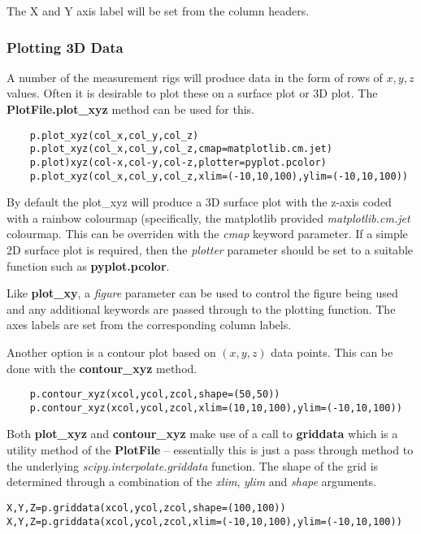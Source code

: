 \documentclass[a4paper,11pt]{scrartcl}
\begin{document}
The X and Y axis label will be set from the column headers.

\subsubsection{Plotting 3D Data}

 A number of the measurement rigs will produce data in the form of rows of $x,y,z$ values. Often it is desirable to plot these on a surface plot or 3D plot. The \textbf{PlotFile.plot\_xyz} method can be used for this.

 \begin{lstlisting}
    p.plot_xyz(col_x,col_y,col_z)
    p.plot_xyz(col_x,col_y,col_z,cmap=matplotlib.cm.jet)
    p.plot)xyz(col-x,col-y,col-z,plotter=pyplot.pcolor)
    p.plot_xyz(col_x,col_y,col_z,xlim=(-10,10,100),ylim=(-10,10,100))
 \end{lstlisting}

 By default the plot\_xyz will produce a 3D surface plot with the z-axis coded with a rainbow colourmap (specifically, the matplotlib provided \textit{matplotlib.cm.jet} colourmap. This can be overriden with the \textit{cmap} keyword parameter. If a simple 2D surface plot is required, then the \textit{plotter} parameter should be set to a suitable function such as \textbf{pyplot.pcolor}.

 Like \textbf{plot\_xy}, a \textit{figure} parameter can be used to control the figure being used and any additional keywords are passed through to the plotting function. The axes labels are set from the corresponding column labels.
 
 Another option is a contour plot based on $(x,y,z)$ data points. This can be done with the \textbf{contour\_xyz} method.
 
 \begin{lstlisting}
 	p.contour_xyz(xcol,ycol,zcol,shape=(50,50))
 	p.contour_xyz(xcol,ycol,zcol,xlim=(10,10,100),ylim=(-10,10,100))
\end{lstlisting} 	

Both \textbf{plot\_xyz} and \textbf{contour\_xyz} make use of a call to \textbf{griddata} which is a utility method of the \textbf{PlotFile} -- essentially this is just a pass through method to the underlying \textit{scipy.interpolate.griddata} function. The shape of the grid is determined through a combination of the \textit{xlim}, \textit{ylim} and \textit{shape} arguments.

\begin{lstlisting}
X,Y,Z=p.griddata(xcol,ycol,zcol,shape=(100,100))
X,Y,Z=p.griddata(xcol,ycol,zcol,xlim=(-10,10,100),ylim=(-10,10,100))
\end{lstlisting}
\end{document}
